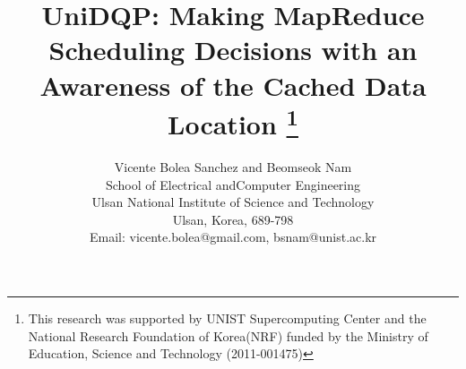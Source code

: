 \documentclass[conference]{IEEEtran}
\begin{document}
\title{
UniDQP: Making MapReduce Scheduling Decisions with an Awareness of the Cached Data Location 
\thanks{This research was supported by UNIST Supercomputing Center and 
the National Research Foundation of Korea(NRF) 
funded by the Ministry of Education, Science and Technology (2011-001475)}
}

\author{{Vicente Bolea Sanchez and Beomseok Nam} \\
        School of Electrical andComputer Engineering\\
        Ulsan National Institute of Science and Technology  \\
        Ulsan, Korea, 689-798 \\
        Email: vicente.bolea@gmail.com, bsnam@unist.ac.kr
}





\maketitle








%



\end{document}
